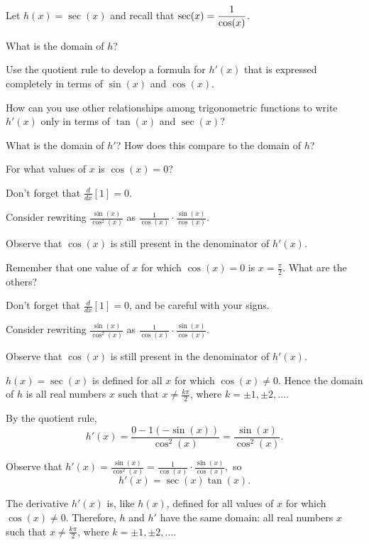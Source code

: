 \begin{activity} \label{A:2.5.5}  
Let $h(x) = \sec(x)$ and recall that $\displaystyle \sec(x) = \frac{1}{\cos(x)}$.
\ba
	\item What is the domain of $h$?
	\item Use the quotient rule to develop a formula for $h'(x)$ that is expressed completely in terms of $\sin(x)$ and $\cos(x)$.
	\item How can you use other relationships among trigonometric functions to write $h'(x)$ only in terms of $\tan(x)$ and $\sec(x)$?
	\item What is the domain of $h'$?  How does this compare to the domain of $h$? 
\ea
\end{activity}
\begin{smallhint}
\ba
	\item For what values of $x$ is $\cos(x) = 0$?
	\item Don't forget that $\frac{d}{dx}[1] = 0$.
	\item Consider rewriting $\frac{\sin(x)}{\cos^2(x)}$ as $\frac{1}{\cos(x)} \cdot \frac{\sin(x)}{\cos(x)}$.
	\item Observe that $\cos(x)$ is still present in the denominator of $h'(x)$. 
\ea
\end{smallhint}
\begin{bighint}
\ba
	\item Remember that one value of $x$ for which $\cos(x) = 0$ is $x = \frac{\pi}{2}$.  What are the others?
	\item Don't forget that $\frac{d}{dx}[1] = 0$, and be careful with your signs.
	\item Consider rewriting $\frac{\sin(x)}{\cos^2(x)}$ as $\frac{1}{\cos(x)} \cdot \frac{\sin(x)}{\cos(x)}$.
	\item Observe that $\cos(x)$ is still present in the denominator of $h'(x)$. 
\ea
\end{bighint}
\begin{activitySolution}
\ba
	\item $h(x) = \sec(x)$ is defined for all $x$ for which $\cos(x) \ne 0$.  Hence the domain of $h$ is all real numbers $x$ such that $x \ne \frac{k\pi}{2}$, where $k = \pm 1, \pm 2, \ldots$.
	\item By the quotient rule,
	$$h'(x) = \frac{0 - 1  (-\sin(x))}{\cos^2(x)} = \frac{\sin(x)}{\cos^2(x)}.$$
	\item Observe that $h'(x) = \frac{\sin(x)}{\cos^2(x)} = \frac{1}{\cos(x)} \cdot \frac{\sin(x)}{\cos(x)},$ so
	$$h'(x) = \sec(x) \tan(x).$$
	\item The derivative $h'(x)$ is, like $h(x)$, defined for all values of $x$ for which $\cos(x) \ne 0$.  Therefore, $h$ and $h'$ have the same domain:  all real numbers $x$ such that $x \ne \frac{k\pi}{2}$, where $k = \pm 1, \pm 2, \ldots$.
\ea
\end{activitySolution}
\aftera
